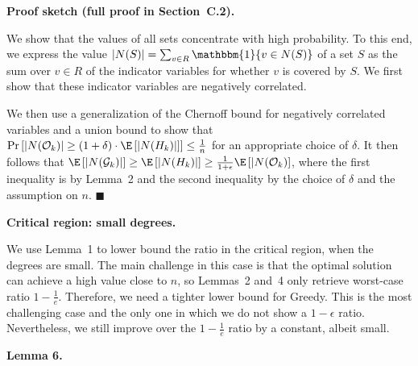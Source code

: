 \documentclass[10pt,a4paper]{article}
\begin{document}



\par\medskip\noindent\textbf{Proof sketch (full proof in Section C.2).}\par



We show that the values of all sets concentrate with high probability. To this end, we express the value $|N(S)|=\sum_{v\in R}\mathbbm{1}\{v\in N(S)\}$ of a set $S$ as the sum over $v\in R$ of the indicator variables for whether $v$ is covered by $S$. We first show that these indicator variables are negatively correlated.\par




We then use a generalization of the Chernoff bound for negatively correlated variables and a union bound to show that $\Pr\left[|N(\mathcal{O}_{k})|\geq(1+\delta)\cdot\E\left[|N(H_{k})|\right]\right]\leq\frac{1}{n}$ for an appropriate choice of $\delta$.
It then follows that
$\E\left[|N(\mathcal{G}_{k})|\right]\geq\E\left[|N(H_{k})|\right]\geq\frac{1}{1+\epsilon}\E\left[|N(\mathcal{O}_{k})\right]$, where the first inequality is by Lemma 2 and the second inequality by the choice of $\delta$ and the assumption on $n$.
\ensuremath{\blacksquare}\par






\par\medskip\noindent\textbf{Critical region: small degrees.}\par




We use Lemma 1 to lower bound the ratio in the critical region, when the degrees are small.
The main challenge in this case is that the optimal solution can achieve a high value close to $n$, so Lemmas 2 and 4 only retrieve worst-case ratio $1-\frac{1}{e}$.
Therefore, we need a tighter lower bound for Greedy.
This is the most challenging case and the only one in which we do not show a $1-\epsilon$ ratio. Nevertheless, we still improve over the $1-\frac{1}{e}$ ratio by a constant, albeit small.\par





\par\medskip\noindent\textbf{\textbf{Lemma 6}\textbf{.}}\par
\end{document}
